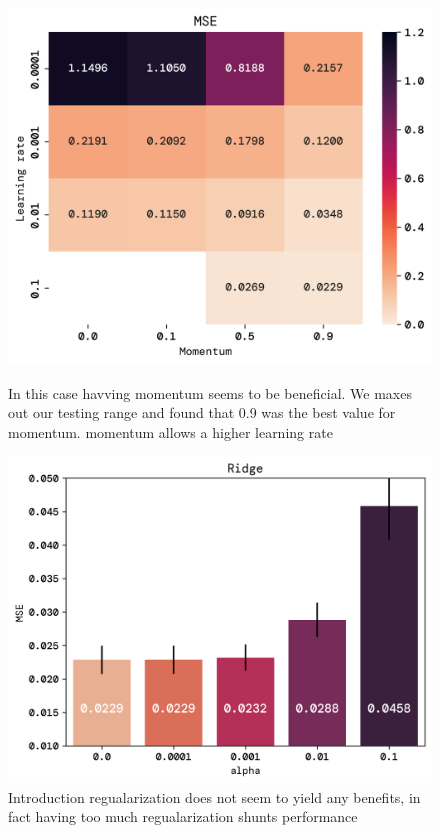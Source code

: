 \documentclass[twoside,11pt]{report}
\begin{document}
\begin{figure}[!ht]
    \begin{minipage}[t]{0.49\textwidth}
        \begin{center}
            \includegraphics[width=\textwidth]{../runsAndFigures/MSE_lr_gamma.png}
        \end{center}
        \caption{In this case havving momentum seems to be beneficial. We maxes out our testing range and found that 0.9 was the best value for momentum. momentum allows a higher learning rate}\label{fig:MSE_lr_gamma}
    \end{minipage}
    \hspace{1mm}
    \begin{minipage}[t]{0.49\textwidth}
        \begin{center}
            \includegraphics[width=\textwidth]{../runsAndFigures/MSE_alpha.png}
        \end{center}
        \caption{Introduction regualarization does not seem to yield any benefits, in fact
        having too much regualarization shunts performance}\label{fig:MSE_aplha}
    \end{minipage}
\end{figure}
\end{document}
